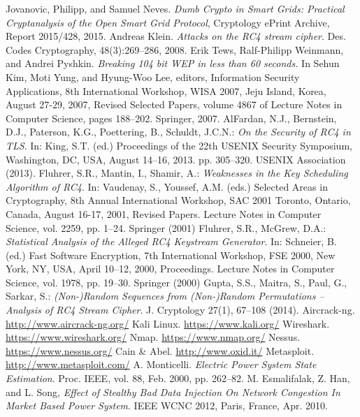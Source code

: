 \documentclass[11pt,oneside]{book}
\begin{document}
\begin{thebibliography}{99}
 Jovanovic, Philipp, and Samuel Neves. \emph{Dumb Crypto in Smart Grids: Practical Cryptanalysis of the Open Smart Grid Protocol}, Cryptology ePrint Archive, Report 2015/428, 2015.
 Andreas Klein. \emph{Attacks on the RC4 stream cipher}. Des. Codes Cryptography, 48(3):269–286, 2008.
 Erik Tews, Ralf-Philipp Weinmann, and Andrei Pyshkin. \emph{Breaking 104 bit WEP in less than 60 seconds.} In Sehun Kim, Moti Yung, and Hyung-Woo Lee, editors, Information Security Applications, 8th International Workshop, WISA 2007, Jeju Island, Korea, August 27-29, 2007, Revised Selected Papers, volume 4867 of Lecture Notes in Computer Science, pages 188–202. Springer, 2007.
 AlFardan, N.J., Bernstein, D.J., Paterson, K.G., Poettering, B., Schuldt, J.C.N.: \emph{On the Security of RC4 in TLS}. In: King, S.T. (ed.) Proceedings of the 22th USENIX Security Symposium, Washington, DC, USA, August 14–16, 2013. pp. 305–320. USENIX Association (2013).
 Fluhrer, S.R., Mantin, I., Shamir, A.: \emph{Weaknesses in the Key Scheduling Algorithm of RC4}. In: Vaudenay, S., Youssef, A.M. (eds.) Selected Areas in Cryptography, 8th Annual International Workshop, SAC 2001 Toronto, Ontario, Canada, August 16-17, 2001, Revised Papers. Lecture Notes in Computer Science, vol. 2259, pp. 1–24. Springer (2001)
 Fluhrer, S.R., McGrew, D.A.: \emph{Statistical Analysis of the Alleged RC4 Keystream Generator}. In: Schneier, B. (ed.) Fast Software Encryption, 7th International Workshop, FSE 2000, New York, NY, USA, April 10–12, 2000, Proceedings. Lecture Notes in Computer Science, vol. 1978, pp. 19–30. Springer (2000)
 Gupta, S.S., Maitra, S., Paul, G., Sarkar, S.: \emph{(Non-)Random Sequences from (Non-)Random Permutations – Analysis of RC4 Stream Cipher}. J. Cryptology 27(1), 67–108 (2014).
 Aircrack-ng. \url{http://www.aircrack-ng.org/}
 Kali Linux. \url{https://www.kali.org/}
 Wireshark. \url{https://www.wireshark.org/}
 Nmap. \url{https://www.nmap.org/}
 Nessus. \url{https://www.nessus.org/}
 Cain \& Abel. \url{http://www.oxid.it/}
 Metasploit. \url{http://www.metasploit.com/}
 A. Monticelli. \emph{Electric Power System State Estimation}. Proc. IEEE, vol. 88, Feb. 2000, pp. 262–82.
 M. Esmalifalak, Z. Han, and L. Song, \emph{Effect of Stealthy Bad Data Injection On Network Congestion In Market Based Power System}. IEEE WCNC 2012, Paris, France, Apr. 2010.

\end{thebibliography}
\end{document}
